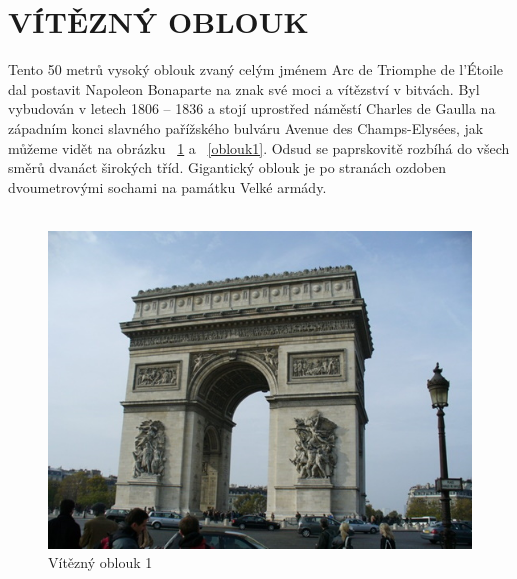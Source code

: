 

\section{VÍTĚZNÝ OBLOUK}



Tento 50 metrů vysoký oblouk zvaný celým jménem Arc de Triomphe de l'Étoile dal postavit Napoleon Bonaparte na znak své moci a vítězství v bitvách. Byl vybudován v letech 1806 – 1836 a stojí uprostřed náměstí Charles de Gaulla na západním konci slavného pařížského bulváru Avenue des Champs-Elysées, jak můžeme vidět na obrázku ~\ref{oblouk} a ~\ref{oblouk1}. Odsud se paprskovitě rozbíhá do všech směrů dvanáct širokých tříd. Gigantický oblouk je po stranách ozdoben dvoumetrovými sochami na památku Velké armády.\cite{allen}\\
\\

\begin{figure}[h!]
\centering
\includegraphics[scale=0.5]{images/obr1.jpg}
\caption{Vítězný oblouk 1}
\label{oblouk}

\end{figure}

